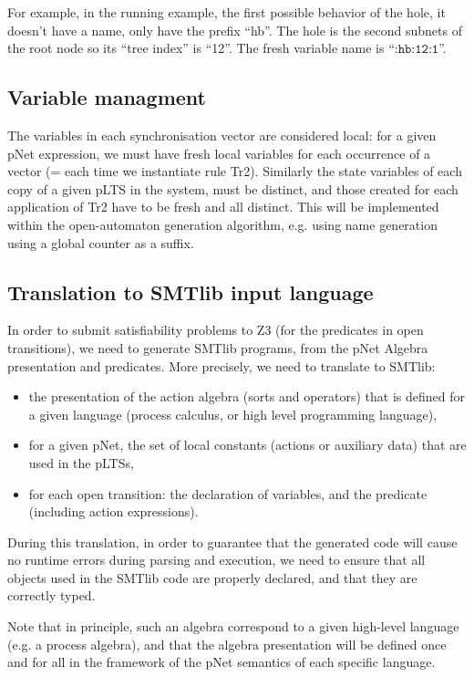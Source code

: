 \documentclass{lncs/llncs}
\newcommand{\OTvar}{\texttt}
\begin{document}
For example, in the running example, the first possible behavior of
the hole, it doesn't have a name, only have the prefix ``hb''. The
hole is the second subnets of the root node so its ``tree index'' is
``12''. The fresh variable name is ``$\OTvar{:hb:12:1}$''. 
\subsection{Variable managment}
The variables in each synchronisation vector are considered local: for a given pNet expression, we must have fresh local variables for each occurrence of a vector (= each time we instantiate rule Tr2). Similarly the state variables of each copy of a given pLTS in the system, must be distinct, and those created for each application of Tr2 have to be fresh and all distinct. This will be implemented within the open-automaton generation algorithm, e.g. using name generation using a global counter as a suffix.

\subsection{Translation to SMTlib input language}
In order to submit satisfiability problems to Z3 (for the predicates
in open transitions), we need to generate SMTlib programs, from the
pNet Algebra presentation and predicates.
More precisely, we need to translate to SMTlib:
\begin{itemize}
  \item the presentation of the action algebra
    (sorts and operators) that is defined for a given language (process calculus, or high level programming language),
    \item for a given pNet, the set of local constants (actions or auxiliary data) that are used in the pLTSs,
    \item for each open transition: the declaration of variables, and
      the predicate (including action expressions).
\end{itemize}

During this translation, in order to guarantee that the generated code
will cause no runtime errors during parsing and execution, we need
to ensure that all objects used in the SMTlib code are properly
declared, and that they are correctly typed.

Note that in principle, such an algebra correspond to a given
high-level language (e.g. a process algebra), and that the algebra
presentation will be defined once and for all in the framework of the
pNet semantics of each specific language.
\end{document}
